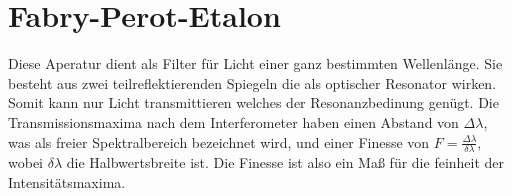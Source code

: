 
\section{Fabry-Perot-Etalon}

Diese Aperatur dient als Filter für Licht einer ganz bestimmten Wellenlänge.
Sie besteht aus zwei teilreflektierenden Spiegeln die als optischer Resonator wirken. Somit kann nur Licht transmittieren welches der Resonanzbedinung genügt. Die Transmissionsmaxima nach dem Interferometer haben einen Abstand von $\Delta \lambda$, was als freier Spektralbereich bezeichnet wird, und einer Finesse von $ F = \frac{\Delta \lambda}{\delta \lambda}$, wobei $\delta \lambda$ die Halbwertsbreite ist. Die Finesse ist also ein Maß für die feinheit der Intensitätsmaxima.